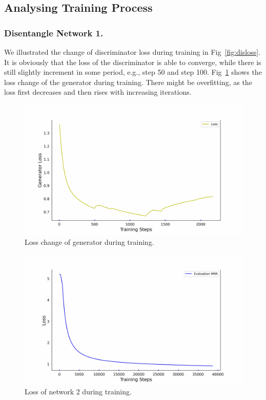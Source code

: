 \subsection{Analysing Training Process} 
\subsubsection{Disentangle Network 1.}
We illustrated the change of discriminator loss during training in Fig~\ref{fig:disloss}. 
It is obviously that the loss of the discriminator is able to converge, 
while there is still slightly increment in some period, e.g., step 50 and step 100.
Fig~\ref{fig:genloss} shows the loss change of the generator during training. 
There might be overfitting, 
as the loss first decreases and then rises with increasing iterations.


\begin{figure}[htb]
	\centering
	\includegraphics[width=0.8\linewidth]{imgs/gen_loss.pdf}
	\caption{Loss change of generator during training.}
	\label{fig:genloss}
\end{figure}

\begin{figure}[htb]
	\centering
	\includegraphics[width=0.8\linewidth]{imgs/st2_loss.pdf}
	\caption{Loss of network 2 during training.}
	\label{fig:st2loss}
\end{figure}

